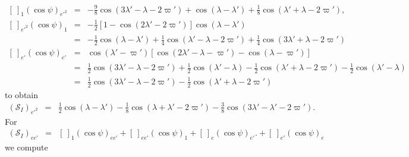 \documentclass [12pt, a4paper] {article}
\begin{document}
\begin {eqnarray}
    \left[\:\right]_1\left(\cos\psi\right)_{e'^2}
    &=&
    - 
    \frac{9}{8}\cos(3\lambda' - \lambda - 2\varpi')
    +
    \cos(\lambda - \lambda')
    +
    \frac{1}{8}\cos(\lambda' + \lambda - 2\varpi'),
    \\
    \left[\:\right]_{e'^2}\left(\cos\psi\right)_{1}
    &=&
    - \frac{1}{2}[1 - \cos(2\lambda' - 2\varpi')]\cos(\lambda - \lambda')
    \\
    &=&
    -\frac{1}{2}\cos(\lambda - \lambda')
    +\frac{1}{4}\cos(\lambda' - \lambda - 2\varpi')
    +\frac{1}{4}\cos(3\lambda' + \lambda - 2\varpi')
    \\
    \left[\:\right]_{e'}\left(\cos\psi\right)_{e'}
    &=&
    \cos(\lambda' - \varpi')
    \left[
        \cos(2\lambda' - \lambda - \varpi') - \cos(\lambda - \varpi')        
    \right]
    \\
    &=&
    \frac{1}{2}\cos(3\lambda' - \lambda - 2\varpi')
    +
    \frac{1}{2}\cos(\lambda' - \lambda)
    - 
    \frac{1}{2}\cos(\lambda' + \lambda - 2\varpi')
    - 
    \frac{1}{2}\cos(\lambda' - \lambda)
    \\
    &=&
    \frac{1}{2}\cos(3\lambda' - \lambda - 2\varpi')
    - 
    \frac{1}{2}\cos(\lambda' + \lambda - 2\varpi')
\end {eqnarray}
to obtain 
\begin {eqnarray}
    \left(
        \mathcal{S}_I
    \right)_{e'^2}
    &=&
    \frac{1}{2}\cos(\lambda - \lambda')
    -
    \frac{1}{8}\cos(\lambda + \lambda' - 2\varpi')
    -
    \frac{3}{8}\cos(3\lambda' - \lambda' - 2\varpi').
\end {eqnarray}
For 
\begin {eqnarray}
    \left(
        \mathcal{S}_I
    \right)_{ee'}
    &=&
    \left[\:\right]_1\left(\cos\psi\right)_{ee'}
    +
    \left[\:\right]_{ee'}\left(\cos\psi\right)_{1}
    +
    \left[\:\right]_{e}\left(\cos\psi\right)_{e'}.
    +
    \left[\:\right]_{e'}\left(\cos\psi\right)_{e}
\end {eqnarray}
we compute 
\end{document}
